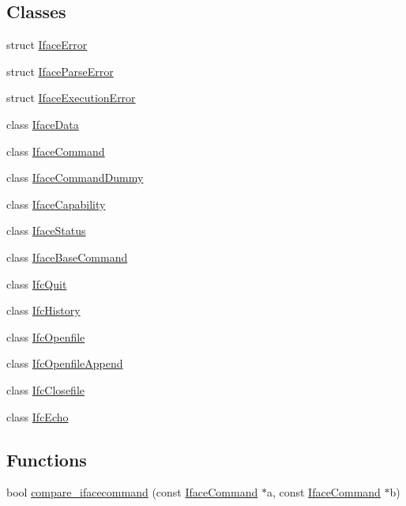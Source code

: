 \subsection*{Classes}
\begin{DoxyCompactItemize}
\item 
struct \mbox{\hyperlink{struct_iface_error}{Iface\+Error}}
\item 
struct \mbox{\hyperlink{struct_iface_parse_error}{Iface\+Parse\+Error}}
\item 
struct \mbox{\hyperlink{struct_iface_execution_error}{Iface\+Execution\+Error}}
\item 
class \mbox{\hyperlink{class_iface_data}{Iface\+Data}}
\item 
class \mbox{\hyperlink{class_iface_command}{Iface\+Command}}
\item 
class \mbox{\hyperlink{class_iface_command_dummy}{Iface\+Command\+Dummy}}
\item 
class \mbox{\hyperlink{class_iface_capability}{Iface\+Capability}}
\item 
class \mbox{\hyperlink{class_iface_status}{Iface\+Status}}
\item 
class \mbox{\hyperlink{class_iface_base_command}{Iface\+Base\+Command}}
\item 
class \mbox{\hyperlink{class_ifc_quit}{Ifc\+Quit}}
\item 
class \mbox{\hyperlink{class_ifc_history}{Ifc\+History}}
\item 
class \mbox{\hyperlink{class_ifc_openfile}{Ifc\+Openfile}}
\item 
class \mbox{\hyperlink{class_ifc_openfile_append}{Ifc\+Openfile\+Append}}
\item 
class \mbox{\hyperlink{class_ifc_closefile}{Ifc\+Closefile}}
\item 
class \mbox{\hyperlink{class_ifc_echo}{Ifc\+Echo}}
\end{DoxyCompactItemize}
\subsection*{Functions}
\begin{DoxyCompactItemize}
\item 
bool \mbox{\hyperlink{interface_8hh_af88fae35f618feee9303bf7d688365bb}{compare\+\_\+ifacecommand}} (const \mbox{\hyperlink{class_iface_command}{Iface\+Command}} $\ast$a, const \mbox{\hyperlink{class_iface_command}{Iface\+Command}} $\ast$b)
\end{DoxyCompactItemize}


